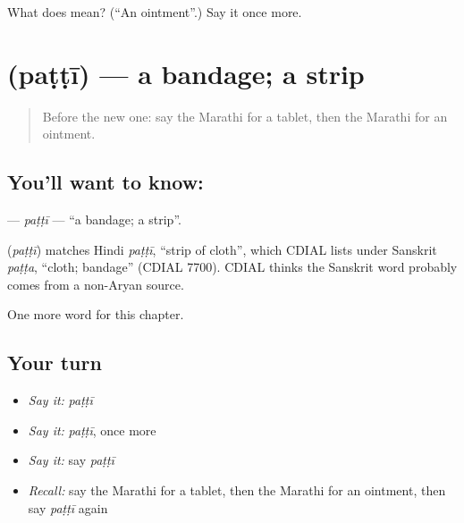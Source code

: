 \begin{tcolorbox}[breakable,colback=teal!4,colframe=teal!35!black,title={Before you move on}]
What does  mean? (\textquotedblleft{}An ointment\textquotedblright{}.) Say it once more.
\end{tcolorbox}
\section[\texorpdfstring{\mr{पट्टी} (paṭṭī)}{पट्टी (paṭṭī)}]{ (paṭṭī) — a bandage; a strip}

\label{lesson:MR-C229-patti}



\begin{quote}
Before the new one: say the Marathi for a tablet, then the Marathi for an ointment.
\end{quote}

\subsection*{You'll want to know: }
\textbf{} — \emph{paṭṭī} — \textquotedblleft{}a bandage; a strip\textquotedblright{}.

\begin{cousinweb}
\textbf{} (\emph{paṭṭī}) matches Hindi \emph{paṭṭī}, \textquotedblleft{}strip of cloth\textquotedblright{}, which CDIAL lists under Sanskrit \emph{paṭṭa}, \textquotedblleft{}cloth; bandage\textquotedblright{} (CDIAL 7700). CDIAL thinks the Sanskrit word probably comes from a non-Aryan source.
\end{cousinweb}

\begin{grammarlens}[title={What you've built}]
One more word for this chapter.
\end{grammarlens}

\subsection*{Your turn}
\begin{itemize}
\raggedright
  \item \emph{Say it:} \emph{paṭṭī}
  \item \emph{Say it:} \emph{paṭṭī}, once more
  \item \emph{Say it:} say \emph{paṭṭī}
  \item \emph{Recall:} say the Marathi for a tablet, then the Marathi for an ointment, then say \emph{paṭṭī} again
\end{itemize}

